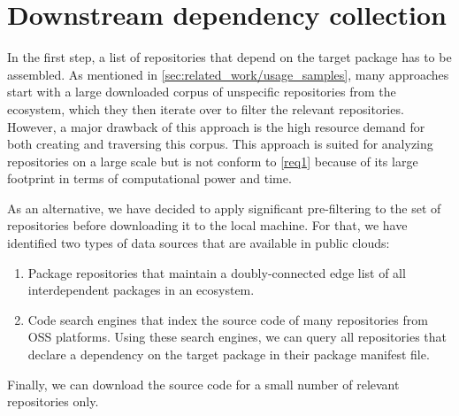 \section{Downstream dependency collection}
\label{sec:dependency_collection}

In the first step, a list of repositories that depend on the target package has to be assembled.
As mentioned in \cref{sec:related_work/usage_samples}, many approaches start with a large downloaded corpus of unspecific repositories from the ecosystem, which they then iterate over to filter the relevant repositories.
However, a major drawback of this approach is the high resource demand for both creating and traversing this corpus.
This approach is suited for analyzing repositories on a large scale but is not conform to \cref{req1} because of its large footprint in terms of computational power and time.

As an alternative, we have decided to apply significant pre-filtering to the set of repositories before downloading it to the local machine.
For that, we have identified two types of data sources that are available in public clouds:

\begin{enumerate}[label=(\roman*)]
	\item Package repositories that maintain a doubly-connected edge list of all interdependent packages in an ecosystem.
	\item Code search engines that index the source code of many repositories from OSS platforms.
		Using these search engines, we can query all repositories that declare a dependency on the target package in their package manifest file.
\end{enumerate}

Finally, we can download the source code for a small number of relevant repositories only.
